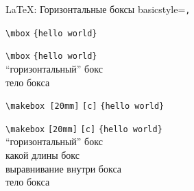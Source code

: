 \begin{frame}[fragile]{\LaTeX: Горизонтальные боксы}\relax
     \lstset
    {
        basicstyle=\tt\normalsize,
    }
     \begin{tabbing}
     
        \lstinline|\mbox| \= \lstinline|{hello world}|\kill

        \lstinline|\mbox| \> \lstinline|{hello world}| \\ \footnotesize
        ``горизонтальный'' бокс\>   \\ 
        \>\footnotesize тело бокса \\
        
    \end{tabbing}
    
    \begin{tabbing}
     
        \lstinline|\makebox |\= \lstinline|[20mm]| \= \lstinline|[c]| \= \lstinline|{hello world}|\kill

        \lstinline|\makebox|\> \lstinline|[20mm]| \> \lstinline|[c]| \> \lstinline|{hello world}| \\ \footnotesize
        ``горизонтальный'' бокс\>  \> \>  \\ 
        \>\footnotesize какой длины бокс  \> \> \\ 
        \>  \>\footnotesize выравнивание внутри бокса  \> \\
        \>  \>  \> \footnotesize тело бокса \\ 
        
    \end{tabbing}
\end{frame}

\cprotect{}

